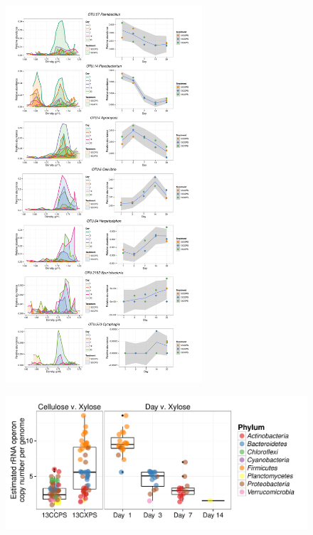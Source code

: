 \begin{figure}[H]
	\begin{center}
	\centerline{\includegraphics[width=0.65\textwidth]{figures/example/examples.pdf}}
	\caption[Counts of $^{13}$C-responders at each day]{\protect}\label{fig:example}
        \end{center}
\end{figure}

\begin{figure}[H] \begin{center}
\centerline{\includegraphics[width=\textwidth]{figures/copy_number/copy_number.pdf}}
\caption[OTU \textit{rrn} gene copy number with time and treatment]{\protect}\label{fig:copy}
\end{center} \end{figure}

